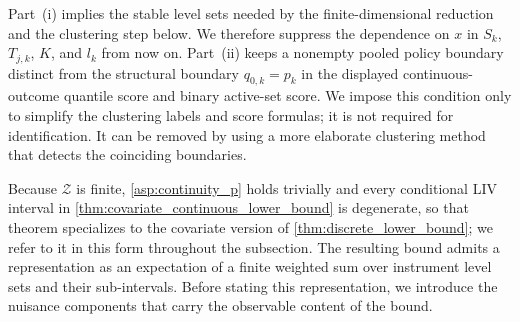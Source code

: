 Part~\textup{(i)} implies the stable level sets needed by the finite-dimensional reduction and the clustering step below. We therefore suppress the dependence on $x$ in $S_k$, $T_{j,k}$, $K$, and $l_k$ from now on. Part~\textup{(ii)} keeps a nonempty pooled policy boundary distinct from the structural boundary $q_{0,k}=p_k$ in the displayed continuous-outcome quantile score and binary active-set score. We impose this condition only to simplify the clustering labels and score formulas; it is not required for identification. It can be removed by using a more elaborate clustering method that detects the coinciding boundaries.

Because $\mathcal{Z}$ is finite, \cref{asp:continuity_p} holds trivially and every conditional LIV interval in \cref{thm:covariate_continuous_lower_bound} is degenerate, so that theorem specializes to the covariate version of \cref{thm:discrete_lower_bound}; we refer to it in this form throughout the subsection. The resulting bound admits a representation as an expectation of a finite weighted sum over instrument level sets and their sub-intervals. Before stating this representation, we introduce the nuisance components that carry the observable content of the bound.

